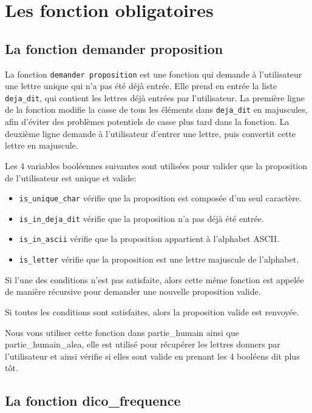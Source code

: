 \documentclass{article}
\def\abc#1{\begingroup\escapechar-1 \expandafter\string\csname#1\endcsname\endgroup}
\begin{document}
\section{Les fonction obligatoires}

\subsection{La fonction demander proposition}

La fonction \verb|demander proposition| est une fonction qui demande à
l'utilisateur une lettre unique qui n'a pas été déjà entrée. Elle prend en entrée la liste \verb|deja_dit|, qui contient les lettres déjà entrées par l'utilisateur. La première ligne de la fonction modifie la casse de tous les éléments dans \verb|deja_dit| en majuscules, afin d'éviter des problèmes potentiels de casse plus tard dans la fonction. La deuxième ligne demande à l'utilisateur d'entrer une lettre, puis convertit cette lettre en majuscule.


Les 4 variables booléennes suivantes sont utilisées pour valider que la proposition de l'utilisateur est unique et valide:

\begin{itemize}
  \item \verb|is_unique_char| vérifie que la proposition est composée d'un seul caractère.
  \item \verb|is_in_deja_dit| vérifie que la proposition n'a pas déjà été entrée.
  \item \verb|is_in_ascii| vérifie que la proposition appartient à l'alphabet ASCII.
  \item \verb|is_letter| vérifie que la proposition est une lettre majuscule de l'alphabet.
\end{itemize}

Si l'une des conditions n'est pas satisfaite, alors cette même fonction est appelée de manière récursive pour demander une nouvelle proposition valide.

Si toutes les conditions sont satisfaites, alors la proposition valide est renvoyée.

Nous vons utiliser cette fonction dans \abc{partie_humain} ainsi que \abc{partie_humain_alea}, elle est utilisé pour récupérer les lettres donners par l'utilisateur et ainsi vérifie si elles sont valide en prenant les 4 booléens dit plus tôt.

\subsection{La fonction \abc{dico_frequence}}
\end{document}
